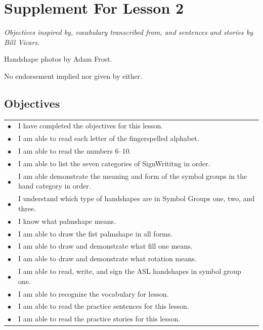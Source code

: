 \documentclass{article}
\begin{document}
\newfontfamily{}
\newfontfamily{}
\newcommand{\bul}{\hfil$\bullet$&}
\renewenvironment{glossary}{\begin{multicols}{5}\begin{center}}{\end{center}\end{multicols}}
\setcounter{secnumdepth}{0}
\setlength{\columnseprule}{1pt}

\section{Supplement For Lesson 2}

\begin{center}
\it
Objectives inspired by, vocabulary transcribed from, and sentences and stories by Bill Vicars.

Handshape photos by Adam Frost.

No endorsement implied nor given by either.
\end{center}

\subsection{Objectives}

\begin{tabular}{p{1cm}p{14cm}}
\bul I have completed the objectives for this lesson.\\
\bul I am able to read each letter of the fingerspelled alphabet.\\
\bul I am able to read the numbers 6--10.\\
\bul I am able to list the seven categories of SignWrititng in order.\\
\bul I am able demonstrate the meaning and form of the symbol groups in the hand category in order.\\
\bul I understand which type of handshapes are in Symbol Groups one, two, and three.\\
\bul I know what palmshape means.\\
\bul I am able to draw the fist palmshape in all forms.\\
\bul I am able to draw and demonstrate what fill one means.\\
\bul I am able to draw and demonstrate what rotation means.\\
\bul I am able to read, write, and sign the ASL handshapes in symbol group one.\\
\bul I am able to recognize the vocabulary for lesson.\\
\bul I am able to read the practice sentences for this lesson.\\
\bul I am able to read the practice stories for this lesson.\\
\end{tabular}
\end{document}
